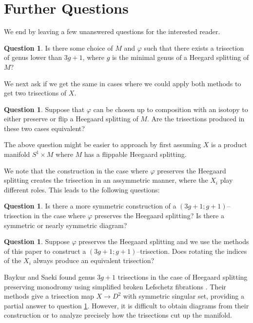\documentclass[12pt]{amsart}
\theoremstyle{definition}
\newtheorem{question}[thm]{Question}
\theoremstyle{remark}
\begin{document}

\section{Further Questions}
\label{sec_questions}

We end by leaving a few unanswered questions for the interested reader.

\begin{question}
Is there some choice of $M$ and $\varphi$ such that there exists a trisection of genus lower than $3g+1$, where $g$ is the minimal genus of a Heegard splitting of $M$?
\end{question}

We next ask if we get the same in cases where we could apply both methods to get two trisections of $X$.

\begin{question}
Suppose that $\varphi$ can be chosen up to composition with an isotopy to either preserve or flip a Heegaard splitting of $M$.
 Are the trisections produced in these two cases equivalent?
\label{unequal1}
\end{question}

The above question might be easier to approach by first assuming $X$ is a product manifold $S^1 \times M$ where $M$ has a flippable Heegaard splitting.


We note that the construction in the case where $\varphi$ preserves the Heegaard splitting creates the trisection in an assymmetric manner, where the $X_i$ play different roles.
This leads to the following questions:
\begin{question}
\label{q_assym}
Is there a more symmetric construction of a $(3g+1;g+1)$--trisection in the case where $\varphi$ preserves the Heegaard splitting?  Is there a symmetric or nearly symmetric diagram?
\end{question}

\begin{question}
Suppose $\varphi$ preserves the Heegaard splitting and we use the methods of this paper to construct a $(3g+1;g+1)$--trisection.
Does rotating the indices of the $X_i$ always produce an equivalent trisection?
\label{unequal3}
\end{question}

Baykur and Saeki found genus $3g+1$ trisections in the case of Heegaard splitting preserving monodromy using simplified broken Lefschetz fibrations \cite{BaykurSaeki1}.
Their methods give a trisection map $X \to D^2$ with symmetric singular set, providing a partial answer to question \ref{q_assym}.
However, it is difficult to obtain diagrams from their construction or to analyze precisely how the trisections cut up the manifold.
\end{document}
